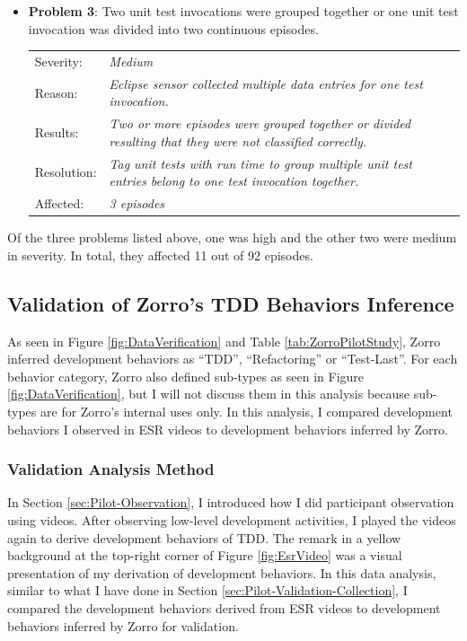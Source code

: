 \begin{itemize}
\item \textbf{Problem 3}: Two unit test invocations were grouped
together or one unit test invocation was divided into two continuous
episodes.
  \begin{tabular}{lp{10cm}}
    Severity: & \small\textit{Medium}\\
    Reason: & \small\textit{Eclipse sensor collected multiple data 
              entries for one test invocation.}\\
    Results: & \small\textit{Two or more episodes were grouped 
               together or divided resulting that they were not 
               classified correctly.} \\
    Resolution: & \small\textit{Tag unit tests with run time to 
                  group multiple unit test entries belong to 
                  one test invocation together.} \\
    Affected: & \small\textit{3 episodes}
  \end{tabular}
\end{itemize}

Of the three problems listed above, one was high and the other two 
were medium in severity. In total, they affected 11 out of 92 
episodes. 

\subsection{Validation of Zorro's TDD Behaviors Inference}
\label{sec:Pilot-Validation-Inference}
As seen in Figure \ref{fig:DataVerification} and Table \ref{tab:ZorroPilotStudy}, 
Zorro inferred development behaviors as ``TDD'', ``Refactoring'' or 
``Test-Last''. For each behavior category, Zorro also defined sub-types 
as seen in Figure \ref{fig:DataVerification}, but I will not discuss them 
in this analysis because sub-types are for Zorro's internal uses only. In 
this analysis, I compared development behaviors I observed in ESR videos 
to development behaviors inferred by Zorro.

\subsubsection{Validation Analysis Method}
In Section \ref{sec:Pilot-Observation}, I introduced how I did participant 
observation using videos. After observing low-level development activities, 
I played the videos again to derive development behaviors of TDD. The remark 
in a yellow background at the top-right corner of Figure \ref{fig:EsrVideo} 
was a visual presentation of my derivation of development behaviors. In this
data analysis, similar to what I have done in Section 
\ref{sec:Pilot-Validation-Collection}, I compared the development behaviors 
derived from ESR videos to development behaviors inferred by Zorro for validation. 

